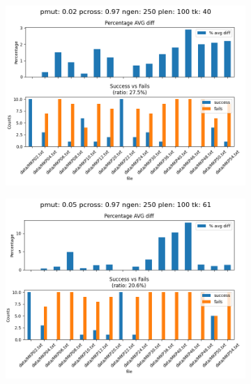 \begin{figure}[H]
    \centering
    \begin{subfigure}{.49\textwidth}
        \includegraphics[width=\textwidth]{img/eval/evaluation_results_2_97_250_100_40.png}
    \end{subfigure}
    \begin{subfigure}{.49\textwidth}
        \includegraphics[width=\textwidth]{img/eval/evaluation_results_5_97_250_100_61.png}
    \end{subfigure}\\


\end{figure}
